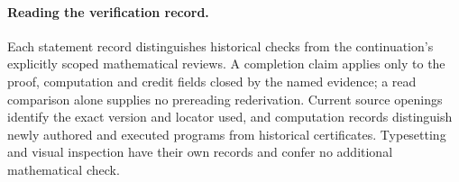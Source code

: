 \paragraph{Reading the verification record.}
Each statement record distinguishes historical checks from the
continuation's explicitly scoped mathematical reviews. A completion
claim applies only to the proof, computation and credit fields closed
by the named evidence; a read comparison alone supplies no prereading
rederivation. Current source openings identify the exact version and
locator used, and computation records distinguish newly authored and
executed programs from historical certificates. Typesetting and visual inspection have their
own records and confer no additional mathematical check.
